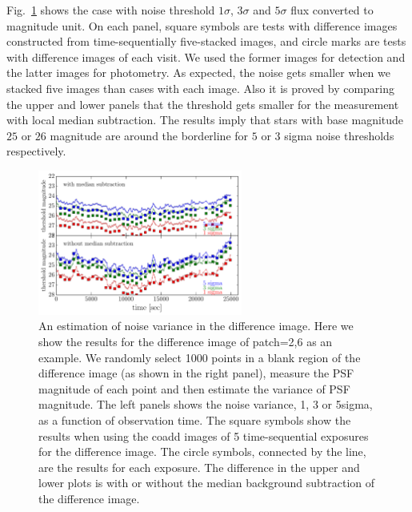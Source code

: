 \documentclass[iop, apj]{emulateapj}
\newcommand{\?}{\stackrel{?}{=}}
\begin{document}
\begin{itemize}
Fig.~\ref{fig:nulltest} shows the case with noise threshold $1\sigma$, $3\sigma$ and $5\sigma$ flux converted to magnitude unit. On each panel, square symbols are tests with difference images constructed from time-sequentially five-stacked images, and circle marks are tests with difference images of each visit. We used the former images for detection and the latter images for photometry. As expected, the noise gets smaller when we stacked five images than cases with each image. Also it is proved by comparing the upper and lower panels that the threshold gets smaller for the measurement with local median subtraction. 
The results imply that stars with base magnitude $25$ or $26$ magnitude are around the borderline for $5$ or $3$ sigma noise thresholds respectively. 
%
\begin{figure}
\centering
\includegraphics[width=0.6\textwidth]{pic/threshold_seeing_coadd_both.pdf}
\caption{\small{An estimation of noise variance in the difference image. Here we show the results for the difference image of patch=2,6 as an example. We randomly select 1000 points in a blank region of the difference image (as shown in the right panel), measure the PSF magnitude of each point and then estimate the variance of PSF magnitude. The left panels shows the noise variance, 1, 3 or 5sigma,  as a function of observation time.  The square symbols show the results when using the coadd images of 5 time-sequential exposures for the difference image. The circle symbols, connected by the line, are the results for each exposure. The difference in the upper and lower plots is with or without the median background subtraction of the difference image. }}
\label{fig:nulltest}
\end{figure}
%


\end{itemize}
\end{document}
